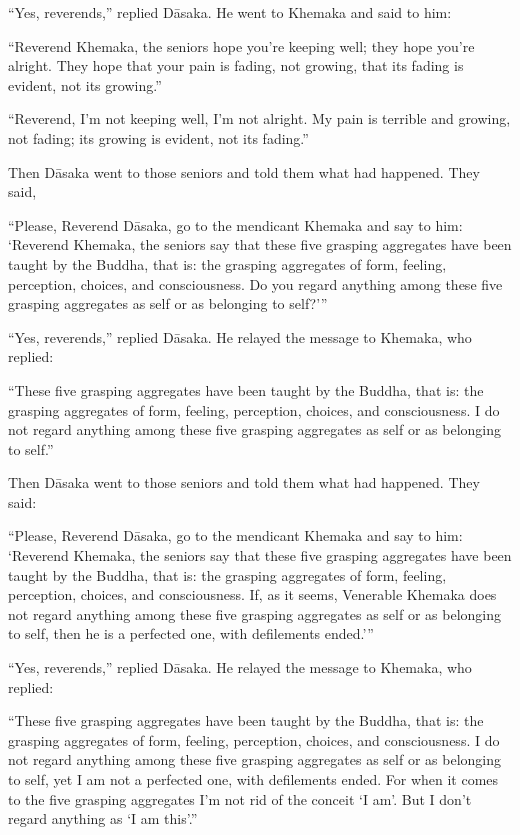 \documentclass[12pt,openany]{book}%
\begin{document}
“Yes, reverends,” replied \textsanskrit{Dāsaka}. He went to Khemaka and said to him: 

“Reverend Khemaka, the seniors hope you’re keeping well; they hope you’re alright. They hope that your pain is fading, not growing, that its fading is evident, not its growing.” 

“Reverend, I’m not keeping well, I’m not alright. My pain is terrible and growing, not fading; its growing is evident, not its fading.” 

Then \textsanskrit{Dāsaka} went to those seniors and told them what had happened. They said, 

“Please, Reverend \textsanskrit{Dāsaka}, go to the mendicant Khemaka and say to him: ‘Reverend Khemaka, the seniors say that these five grasping aggregates have been taught by the Buddha, that is: the grasping aggregates of form, feeling, perception, choices, and consciousness. Do you regard anything among these five grasping aggregates as self or as belonging to self?’” 

“Yes, reverends,” replied \textsanskrit{Dāsaka}. He relayed the message to Khemaka, who replied: 

“These five grasping aggregates have been taught by the Buddha, that is: the grasping aggregates of form, feeling, perception, choices, and consciousness. I do not regard anything among these five grasping aggregates as self or as belonging to self.” 

Then \textsanskrit{Dāsaka} went to those seniors and told them what had happened. They said: 

“Please, Reverend \textsanskrit{Dāsaka}, go to the mendicant Khemaka and say to him: ‘Reverend Khemaka, the seniors say that these five grasping aggregates have been taught by the Buddha, that is: the grasping aggregates of form, feeling, perception, choices, and consciousness. If, as it seems, Venerable Khemaka does not regard anything among these five grasping aggregates as self or as belonging to self, then he is a perfected one, with defilements ended.’” 

“Yes, reverends,” replied \textsanskrit{Dāsaka}. He relayed the message to Khemaka, who replied: 

“These five grasping aggregates have been taught by the Buddha, that is: the grasping aggregates of form, feeling, perception, choices, and consciousness. I do not regard anything among these five grasping aggregates as self or as belonging to self, yet I am not a perfected one, with defilements ended. For when it comes to the five grasping aggregates I’m not rid of the conceit ‘I am’. But I don’t regard anything as ‘I am this’.” 
\end{document}
